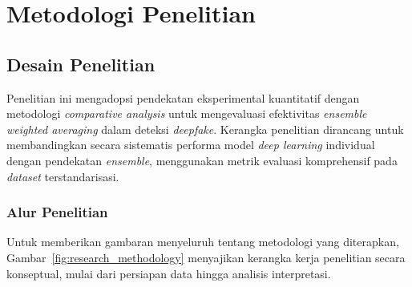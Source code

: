 \chapter{Metodologi Penelitian} \label{ch:metodologi}

\section{Desain Penelitian}

Penelitian ini mengadopsi pendekatan eksperimental kuantitatif dengan metodologi \textit{comparative analysis} untuk mengevaluasi efektivitas \textit{ensemble weighted averaging} dalam deteksi \textit{deepfake}. Kerangka penelitian dirancang untuk membandingkan secara sistematis performa model \textit{deep learning} individual dengan pendekatan \textit{ensemble}, menggunakan metrik evaluasi komprehensif pada \textit{dataset} terstandarisasi.

\subsection{Alur Penelitian}

Untuk memberikan gambaran menyeluruh tentang metodologi yang diterapkan, Gambar~\ref{fig:research_methodology} menyajikan kerangka kerja penelitian secara konseptual, mulai dari persiapan data hingga analisis interpretasi.

